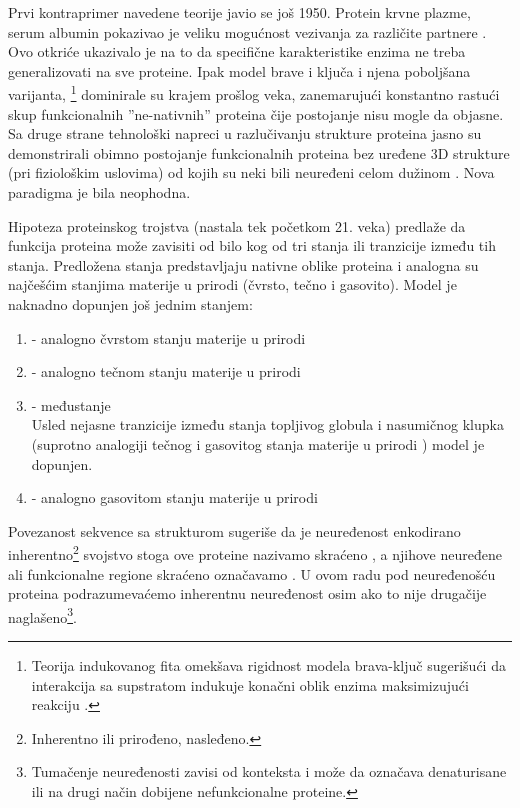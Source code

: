 Prvi kontraprimer navedene teorije javio se još 1950. Protein krvne plazme,
serum albumin pokazivao je veliku mogućnost vezivanja za različite partnere
\parencite{dunker2001}. Ovo otkriće ukazivalo je na to da specifične
karakteristike enzima ne treba generalizovati na sve proteine. Ipak model brave
i ključa i njena poboljšana varijanta,
\footnote{Teorija indukovanog fita omekšava
rigidnost modela brava-ključ sugerišući da interakcija sa supstratom indukuje
konačni oblik enzima maksimizujući reakciju \parencite{biology}.}
 dominirale su krajem prošlog veka, zanemarujući
konstantno rastući skup funkcionalnih ''ne-nativnih'' proteina čije postojanje
nisu mogle da objasne.  Sa druge strane tehnološki napreci u razlučivanju
strukture proteina jasno su demonstrirali obimno postojanje funkcionalnih
proteina bez uređene 3D strukture (pri fiziološkim uslovima)  od kojih su neki
bili neuređeni celom dužinom \parencite{dunker2001}.  Nova paradigma je bila
neophodna.

Hipoteza proteinskog trojstva \parencite{dunker2001} (nastala tek početkom
21. veka) predlaže da funkcija proteina može zavisiti od bilo kog od tri
stanja ili tranzicije između tih stanja. Predložena stanja predstavljaju
nativne oblike proteina i analogna su najčešćim stanjima materije u prirodi
(čvrsto, tečno i gasovito).  Model je naknadno dopunjen još jednim stanjem:
\begin{enumerate}
  \item {} - analogno čvrstom stanju materije u prirodi

  \item {}  - analogno tečnom stanju materije u prirodi

  \item {}  - međustanje\\ 
    Usled nejasne tranzicije između stanja topljivog globula i nasumičnog
    klupka (suprotno analogiji tečnog i gasovitog stanja materije u prirodi \parencite{dunker2001})
    model je dopunjen.

  \item {}  - analogno gasovitom stanju materije u prirodi
\end{enumerate}

Povezanost sekvence sa strukturom sugeriše da je neuređenost enkodirano
inherentno\footnote{Inherentno ili prirođeno, nasleđeno.} svojstvo \parencite{dunker2001}
stoga ove proteine nazivamo 
 skraćeno , a njihove neuređene
ali funkcionalne regione skraćeno označavamo 
\parencite{uversky2016}. U ovom radu pod neuređenošću proteina podrazumevaćemo
inherentnu neuređenost osim ako to nije drugačije naglašeno\footnote{Tumačenje
  neuređenosti zavisi od konteksta i može da označava denaturisane ili na drugi
način dobijene nefunkcionalne proteine.}.


